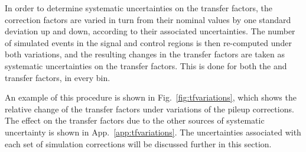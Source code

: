 In order to determine systematic uncertainties on the transfer factors, the 
correction factors are varied in turn from their nominal values by one standard 
deviation up and down, according to their associated uncertainties. The number 
of simulated events in the signal and control regions is then re-computed under 
both variations, and the resulting changes in the transfer factors are taken as 
systematic uncertainties on the transfer factors. This is done for both the 
\Tmutottw and \Tmumutoz transfer factors, in every \njnbht bin. 

An example of this procedure is 
shown in Fig.~\ref{fig:tfvariations}, which shows the relative change 
of the transfer factors under variations of the pileup corrections. 
The effect on the transfer factors due to the other sources of systematic 
uncertainty is shown in App.~\ref{app:tfvariations}.
The uncertainties associated with each set of simulation corrections will be  
discussed further in this section.

